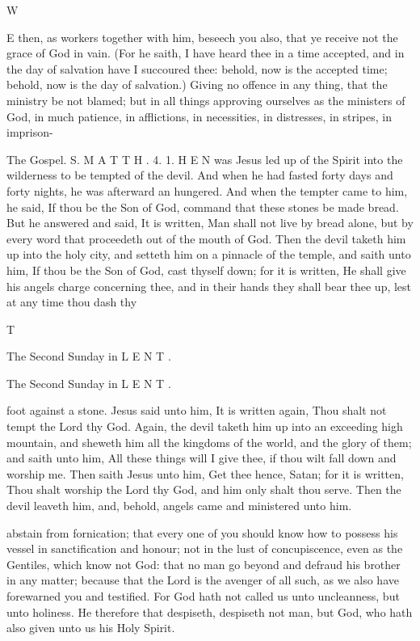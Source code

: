 W

E then, as workers together with him, beseech you also, that ye receive not the grace of God in vain. (For he saith, I have heard thee in a time accepted, and in the day of salvation have I succoured thee: behold, now is the accepted time; behold, now is the day of salvation.) Giving no offence in any thing, that the ministry be not blamed; but in all things approving ourselves as the ministers of God, in much patience, in afflictions, in necessities, in distresses, in stripes, in imprison-

The Gospel. S. M A T T H . 4. 1. H E N was Jesus led up of the Spirit into the wilderness to be tempted of the devil. And when he had fasted forty days and forty nights, he was afterward an hungered. And when the tempter came to him, he said, If thou be the Son of God, command that these stones be made bread. But he answered and said, It is written, Man shall not live by bread alone, but by every word that proceedeth out of the mouth of God. Then the devil taketh him up into the holy city, and setteth him on a pinnacle of the temple, and saith unto him, If thou be the Son of God, cast thyself down; for it is written, He shall give his angels charge concerning thee, and in their hands they shall bear thee up, lest at any time thou dash thy

T

The Second Sunday in L E N T .

The Second Sunday in L E N T .

foot against a stone. Jesus said unto him, It is written again, Thou shalt not tempt the Lord thy God. Again, the devil taketh him up into an exceeding high mountain, and sheweth him all the kingdoms of the world, and the glory of them; and saith unto him, All these things will I give thee, if thou wilt fall down and worship me. Then saith Jesus unto him, Get thee hence, Satan; for it is written, Thou shalt worship the Lord thy God, and him only shalt thou serve. Then the devil leaveth him, and, behold, angels came and ministered unto him.

abstain from fornication; that every one of you should know how to possess his vessel in sanctification and honour; not in the lust of concupiscence, even as the Gentiles, which know not God: that no man go beyond and defraud his brother in any matter; because that the Lord is the avenger of all such, as we also have forewarned you and testified. For God hath not called us unto uncleanness, but unto holiness. He therefore that despiseth, despiseth not man, but God, who hath also given unto us his Holy Spirit.


